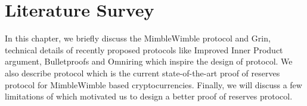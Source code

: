 
\chapter{Literature Survey}
\label{chap:lit}

In this chapter, we briefly discuss the MimbleWimble protocol and Grin, technical details of recently proposed protocols like Improved Inner Product argument, Bulletproofs \cite{Bunz2018} and Omniring \cite{Lai2019} which inspire the design of \RB protocol.
We also describe \R protocol which is the current state-of-the-art proof of reserves protocol for MimbleWimble based cryptocurrencies.
Finally, we will discuss a few limitations of \R which motivated us to design a better proof of reserves protocol.













